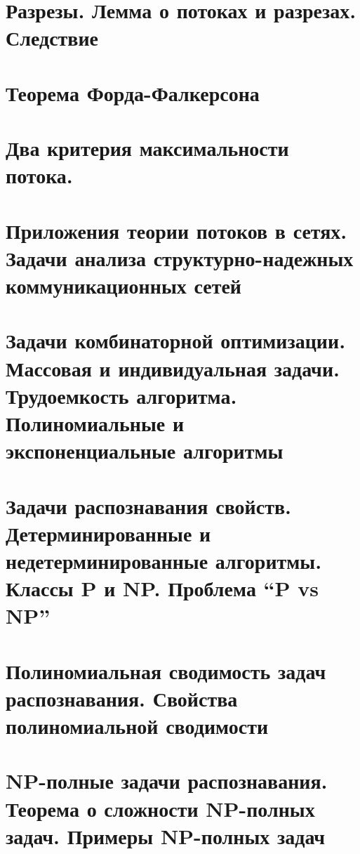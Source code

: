 \documentclass[a4paper]{article}
\theoremstyle{definition}
\theoremstyle{remark}
\begin{document}
    \section{Разрезы. Лемма о потоках и разрезах. Следствие}
    \section{Теорема Форда-Фалкерсона}
    \section{Два критерия максимальности потока.}
    \section{Приложения теории потоков в сетях. Задачи анализа структурно-надежных 
    коммуникационных сетей}
    \section{Задачи комбинаторной оптимизации. Массовая и индивидуальная задачи. 
    Трудоемкость алгоритма. Полиномиальные и экспоненциальные алгоритмы}
    \section{Задачи распознавания свойств. Детерминированные и недетерминированные 
    алгоритмы. Классы P и NP. Проблема “P vs NP”}
    \section{Полиномиальная сводимость задач распознавания. Свойства полиномиальной 
    сводимости}
    \section{NP-полные задачи распознавания. Теорема о сложности NP-полных задач. Примеры 
    NP-полных задач}
\end{document}
